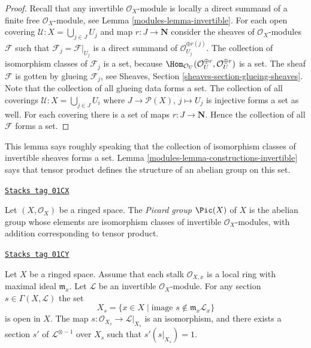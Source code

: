 \begin{proof}

Recall that any invertible $\mathcal{O}_X$-module is locally
a direct summand of a finite free $\mathcal{O}_X$-module, see
Lemma \ref{modules-lemma-invertible}.
For each open covering $\mathcal{U} : X = \bigcup_{j \in J} U_j$
and map $r : J \to \mathbf{N}$ consider the sheaves of
$\mathcal{O}_X$-modules $\mathcal{F}$ such that
$\mathcal{F}_j = \mathcal{F}|_{U_j}$ is a direct summand of
$\mathcal{O}_{U_j}^{\oplus r(j)}$.
The collection of isomorphism classes of $\mathcal{F}_j$ is a set, because
$\Hom_{\mathcal{O}_U}(\mathcal{O}_U^{\oplus r}, \mathcal{O}_U^{\oplus r})$
is a set. The sheaf $\mathcal{F}$ is gotten by glueing $\mathcal{F}_j$,
see Sheaves, Section
\ref{sheaves-section-glueing-sheaves}. Note that the collection of
all glueing data forms a set. The collection of all coverings
$\mathcal{U} : X = \bigcup_{j \in J} U_i$ where $J \to \mathcal{P}(X)$,
$j \mapsto U_j$ is injective forms a set as well. For each covering
there is a set of maps $r : J \to \mathbf{N}$. Hence the collection
of all $\mathcal{F}$ forms a set.
\end{proof}

This lemma says roughly speaking that the collection of
isomorphism classes of invertible sheaves forms a set.
Lemma \ref{modules-lemma-constructions-invertible} says that
tensor product defines the structure of an abelian group
on this set.

\begin{definition}[Pic]
\label{modules-definition-pic}
\href{https://stacks.math.columbia.edu/tag/01CX}{\texttt{Stacks tag 01CX}}

Let $(X, \mathcal{O}_X)$ be a ringed space.
The {\it Picard group} $\Pic(X)$ of $X$ is the
abelian group whose elements are isomorphism classes of
invertible $\mathcal{O}_X$-modules, with addition
corresponding to tensor product.
\end{definition}

\begin{lemma}
\label{modules-lemma-s-open}
\href{https://stacks.math.columbia.edu/tag/01CY}{\texttt{Stacks tag 01CY}}


Let $X$ be a ringed space. Assume that each stalk $\mathcal{O}_{X, x}$
is a local ring with maximal ideal $\mathfrak m_x$.
Let $\mathcal{L}$ be an invertible $\mathcal{O}_X$-module.
For any section $s \in \Gamma(X, \mathcal{L})$ the set
$$
X_s = \{x \in X \mid \text{image }s \not\in \mathfrak m_x\mathcal{L}_x\}
$$
is open in $X$. The map $s : \mathcal{O}_{X_s} \to \mathcal{L}|_{X_s}$
is an isomorphism, and there exists a section $s'$
of $\mathcal{L}^{\otimes -1}$ over $X_s$ such that $s' (s|_{X_s}) = 1$.
\end{lemma}

